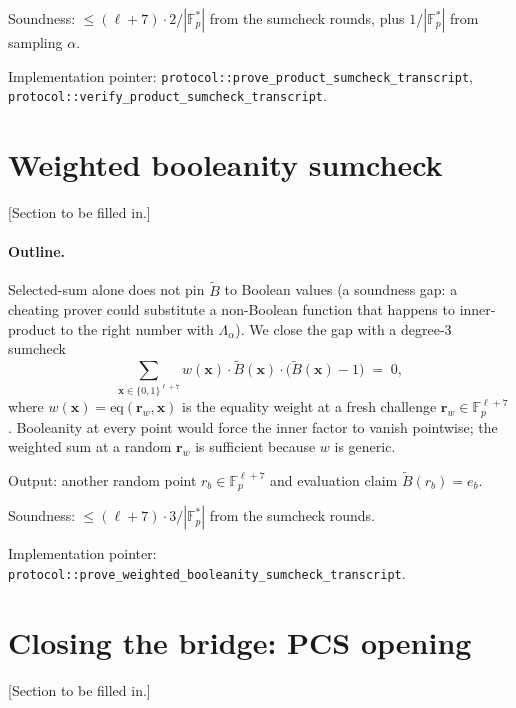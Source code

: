 \documentclass[11pt,a4paper]{article}
\theoremstyle{definition}
\theoremstyle{remark}
\newcommand{\akF}{\mathbb{F}_{p}}                %
\newcommand{\eq}{\mathrm{eq}}                    %
\newcommand{\MLE}[1]{\widetilde{#1}}              %
\newcommand{\BitTable}{B}                         %
\newcommand{\boolPoint}{r_b}                      %
\newcommand{\evalBool}{e_b}                       %
\newcommand{\bits}{\{0,1\}}
\begin{document}
Soundness: $\le (\ell + 7) \cdot 2 / |\akF^*|$ from the sumcheck rounds,
plus $1/|\akF^*|$ from sampling $\alpha$.

Implementation pointer: \verb|protocol::prove_product_sumcheck_transcript|,
\verb|protocol::verify_product_sumcheck_transcript|.


\section{Weighted booleanity sumcheck}
\label{sec:booleanity}

\textsf{[Section to be filled in.]}

\paragraph{Outline.}
Selected-sum alone does not pin $\MLE{\BitTable}$ to Boolean values
(a soundness gap: a cheating prover could substitute a non-Boolean
function that happens to inner-product to the right number with
$\Lambda_\alpha$). We close the gap with a degree-3 sumcheck
\[
   \sum_{\mathbf{x} \in \bits^{\ell+7}} w(\mathbf{x}) \cdot
   \MLE{\BitTable}(\mathbf{x}) \cdot
   \bigl(\MLE{\BitTable}(\mathbf{x}) - 1\bigr) \;=\; 0,
\]
where $w(\mathbf{x}) = \eq(\mathbf{r}_w, \mathbf{x})$ is the equality
weight at a fresh challenge $\mathbf{r}_w \in \akF^{\ell + 7}$.
Booleanity at every point would force the inner factor to vanish
pointwise; the weighted sum at a random $\mathbf{r}_w$ is sufficient
because $w$ is generic.

Output: another random point $\boolPoint \in \akF^{\ell + 7}$ and
evaluation claim $\MLE{\BitTable}(\boolPoint) = \evalBool$.

Soundness: $\le (\ell + 7) \cdot 3 / |\akF^*|$ from the sumcheck rounds.

Implementation pointer:
\verb|protocol::prove_weighted_booleanity_sumcheck_transcript|.


\section{Closing the bridge: PCS opening}
\label{sec:closing}

\textsf{[Section to be filled in.]}
\end{document}
